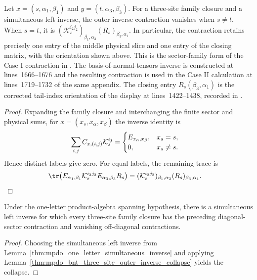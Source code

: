 \begin{lemma}
    \label{thm:mpdo_bnt_three_site_outer_inverse_collapse}
    \leanok
    Let $x=(s,\alpha_1,\beta_1)$ and
    $y=(t,\alpha_3,\beta_3)$. For a three-site family closure and a
    simultaneous left inverse, the outer inverse contraction vanishes when
    $s\ne t$. When $s=t$, it is
    $(\mathcal K_s^{i_2j_2})_{\beta_1,\alpha_3}
        (R_s)_{\beta_3,\alpha_1}$.
    In particular, the contraction retains precisely one entry of the middle
    physical slice and one entry of the closing matrix, with the orientation
    shown above. This is the sector-family form of the Case I contraction in
    \cite[Appendix~C.2, lines~1415--1438]{Cirac2016MPDO_arXiv}. The
    basis-of-normal-tensors inverse is constructed at lines~1666--1676 and the
    resulting contraction is used in the Case II calculation at
    lines~1719--1732 of the same appendix.
    The closing entry $R_s(\beta_3,\alpha_1)$ is the corrected tail-index
    orientation of the display at lines~1422--1438, recorded in
    \cite{gap:cpgsv17_mpdo_sal_zcl_eta_local_structure}.
\end{lemma}

\begin{proof}\leanok
    Expanding the family closure and interchanging the finite sector and physical
    sums, for $x=(x_s,x_\alpha,x_\beta)$ the inverse identity is
    \begin{align}
        \sum_{i,j} C_{x,(i,j)}\mathcal K_s^{ij}
         & =
        \begin{cases}
            E_{x_\alpha,x_\beta}, & x_s=s,    \\
            0,                    & x_s\ne s.
        \end{cases}
        \notag
    \end{align}
    Hence distinct labels give zero. For equal labels, the remaining trace is
    \begin{align}
        \tr\!\left(E_{\alpha_1,\beta_1}\mathcal K_s^{i_2j_2}
        E_{\alpha_3,\beta_3}R_s\right)
         & =(\mathcal K_s^{i_2j_2})_{\beta_1,\alpha_3}
        (R_s)_{\beta_3,\alpha_1}.
        \notag
    \end{align}
\end{proof}

\begin{corollary}
    \label{cor:mpdo_bnt_three_site_outer_inverse_collapse}
    \leanok
    Under the one-letter product-algebra spanning hypothesis, there is a
    simultaneous left inverse for which every three-site family closure has
    the preceding diagonal-sector contraction and vanishing off-diagonal
    contractions.
\end{corollary}

\begin{proof}\leanok
    Choosing the simultaneous left inverse from
    Lemma~\ref{thm:mpdo_one_letter_simultaneous_inverse} and applying
    Lemma~\ref{thm:mpdo_bnt_three_site_outer_inverse_collapse} yields the
    collapse.
\end{proof}
